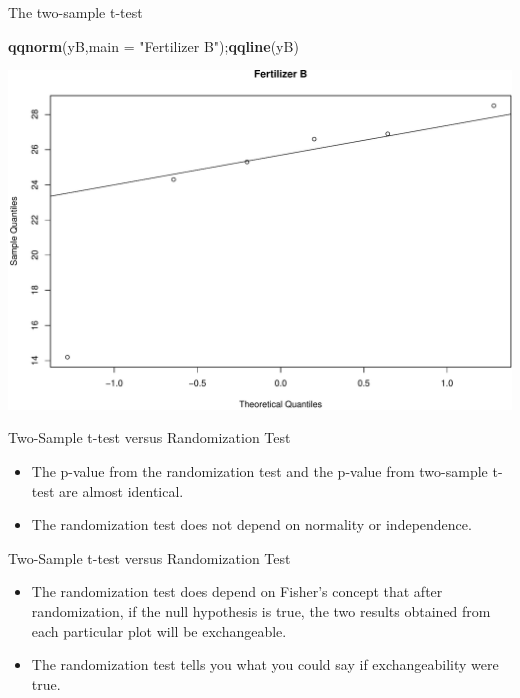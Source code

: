 \documentclass[9pt,ignorenonframetext,]{beamer}
\newenvironment{Shaded}{\begin{snugshade}}{\end{snugshade}}
\newcommand{\KeywordTok}[1]{\textcolor[rgb]{0.13,0.29,0.53}{\textbf{{#1}}}}
\newcommand{\DataTypeTok}[1]{\textcolor[rgb]{0.13,0.29,0.53}{{#1}}}
\newcommand{\StringTok}[1]{\textcolor[rgb]{0.31,0.60,0.02}{{#1}}}
\newcommand{\NormalTok}[1]{{#1}}
\begin{document}
\begin{frame}[fragile]{The two-sample t-test}

\begin{Shaded}
\begin{Highlighting}[]
\KeywordTok{qqnorm}\NormalTok{(yB,}\DataTypeTok{main =} \StringTok{"Fertilizer B"}\NormalTok{);}\KeywordTok{qqline}\NormalTok{(yB)}
\end{Highlighting}
\end{Shaded}

\includegraphics{class4slides-jan18_files/figure-beamer/unnamed-chunk-17-1.pdf}

\end{frame}

\begin{frame}{Two-Sample t-test versus Randomization Test}

\begin{itemize}
\item
  The p-value from the randomization test and the p-value from
  two-sample t-test are almost identical.
\item
  The randomization test does not depend on normality or independence.
\end{itemize}

\end{frame}

\begin{frame}{Two-Sample t-test versus Randomization Test}

\begin{itemize}
\item
  The randomization test does depend on Fisher's concept that after
  randomization, if the null hypothesis is true, the two results
  obtained from each particular plot will be exchangeable.
\item
  The randomization test tells you what you could say if exchangeability
  were true.
\end{itemize}

\end{frame}
\end{document}
